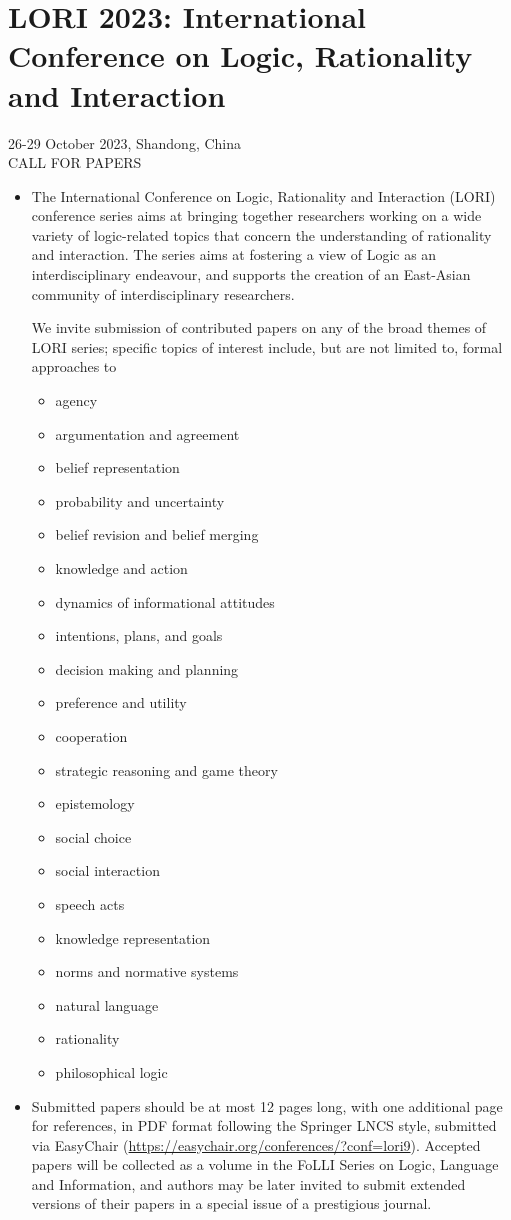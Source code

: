 \documentclass[prodmode,acmtecs]{acmsmall} %
\begin{document}
\begin{itemize}
\end{itemize}\section{LORI 2023: International Conference on Logic, Rationality and Interaction}\label{LORI2023}  26-29 October 2023, Shandong, China\\ 
CALL FOR PAPERS 

\begin{itemize}\item  The International Conference on Logic, Rationality and Interaction (LORI) conference series aims at bringing together researchers working on a wide variety of logic-related topics that concern the understanding of rationality and interaction. The series aims at fostering a view of Logic as an interdisciplinary endeavour, and supports the creation of an East-Asian community of interdisciplinary researchers. 
 
  We invite submission of contributed papers on any of the broad themes of LORI series; specific topics of interest include, but are not limited to, formal approaches to 
 
\begin{itemize}\item  agency
\item  argumentation and agreement
\item  belief representation
\item  probability and uncertainty
\item  belief revision and belief merging
\item  knowledge and action
\item  dynamics of informational attitudes
\item  intentions, plans, and goals
\item  decision making and planning
\item  preference and utility
\item  cooperation
\item  strategic reasoning and game theory
\item  epistemology
\item  social choice
\item  social interaction
\item  speech acts
\item  knowledge representation
\item  norms and normative systems
\item  natural language
\item  rationality
\item  philosophical logic
\end{itemize} 
\item  Submitted papers should be at most 12 pages long, with one additional page for references, in PDF format following the Springer LNCS style, submitted via EasyChair (\href{https://easychair.org/conferences/?conf=lori9}{https://easychair.org/conferences/?conf=lori9}). Accepted papers will be collected as a volume in the FoLLI Series on Logic, Language and Information, and authors may be later invited to submit extended versions of their papers in a special issue of a prestigious journal. 
 

\end{itemize}
\end{document}
